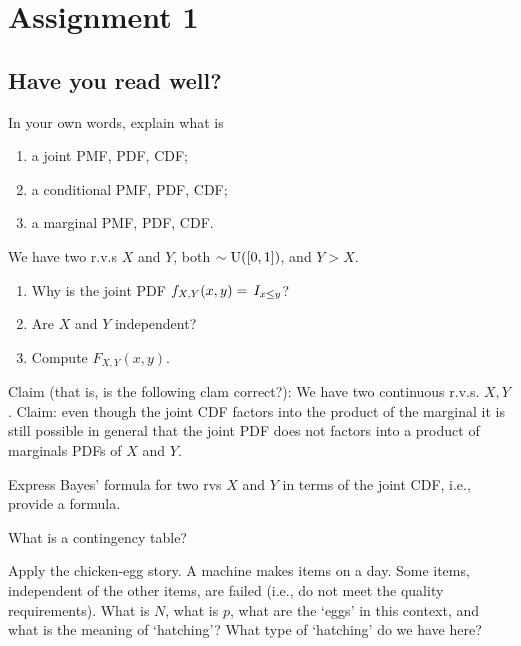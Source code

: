 \documentclass[assignments]{subfiles}
\begin{document}
\section{Assignment 1}
\label{sec:org9cbca82}


\subsection{Have you read well?}
\label{sec:have-you-read}


\begin{exercise}
In your own words, explain what is
\begin{enumerate}
\item a joint PMF, PDF, CDF;
\item a conditional PMF, PDF, CDF;
\item a marginal PMF, PDF, CDF.
\end{enumerate}
\end{exercise}


\begin{exercise}
We have two r.v.s $X$ and $Y$, both $\sim\mathrm{U}([0,1])$, and $Y>X$. 
\begin{enumerate}
\item Why is the joint PDF $f_{X,Y}(x,y) = \,I_{x\leq y}$? 
\item Are $X$ and $Y$ independent? 
\item Compute $F_{X,Y}(x,y)$. 
\end{enumerate}
\end{exercise}

\begin{exercise}
Claim (that is, is the following clam correct?):  We have two continuous r.v.s. $X, Y$. Claim: even though the joint CDF factors into the product of the marginal it  is still possible in general that the joint PDF does not factors into a product of marginals PDFs of $X$ and $Y$.
\end{exercise}

\begin{exercise}
Express Bayes' formula for two rvs $X$ and $Y$ in terms of the joint CDF, i.e., provide a formula.
\end{exercise}

\begin{exercise}
What is a contingency table?
\end{exercise}

\begin{exercise}
Apply the chicken-egg story.
A machine makes items on a day.
Some items, independent of the other items, are failed (i.e., do not meet the quality requirements).
What is $N$, what is $p$, what are the `eggs' in this context, and what is the meaning of `hatching'?
What type of `hatching' do we have here?
\end{exercise}
\end{document}

